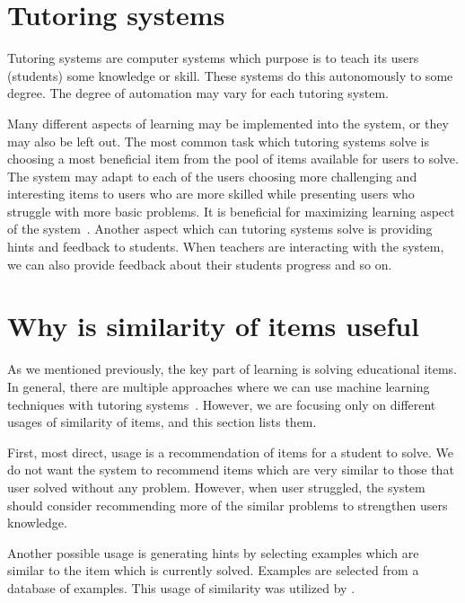 \documentclass[
  printed, %
  table,   %
  nolof,     %
  nolot,     %
  color,
  final,
  nocover
]{fithesis3}
\begin{document}
\section{Tutoring systems}\label{tutoring-systems}

Tutoring systems are computer systems which purpose is to teach its users (students) some knowledge or skill. These systems do this autonomously to some degree. The degree of automation may vary for each tutoring system.


Many different aspects of learning may be implemented into the system, or they may also be left out. The most common task which tutoring systems solve is choosing a most beneficial item from the pool of items available for users to solve. The system may adapt to each of the users choosing more challenging and interesting items to users who are more skilled while presenting users who struggle with more basic problems. It is beneficial for maximizing learning aspect of the system~\cite{papouvsek2015impact}. Another aspect which can tutoring systems solve is providing hints and feedback to students. When teachers are interacting with the system, we can also provide feedback about their students progress and so on.


\section{Why is similarity of items useful}\label{why-is-similarity-of-items-useful}


As we mentioned previously, the key part of learning is solving educational items. In general, there are multiple approaches where we can use machine learning techniques with tutoring systems~\cite{baker2010data}. However, we are focusing only on different usages of similarity of items, and this section lists them.

First, most direct, usage is a recommendation of items for a student to solve. We do not want the system to recommend items which are very similar to those that user solved without any problem. However, when user struggled, the system should consider recommending more of the similar problems to strengthen users knowledge.

Another possible usage is generating hints by selecting examples which are similar to the item which is currently solved. Examples are selected from a database of examples. This usage of similarity was utilized by \citeauthor{hosseini2017study}\cite{hosseini2017study}.
\end{document}
